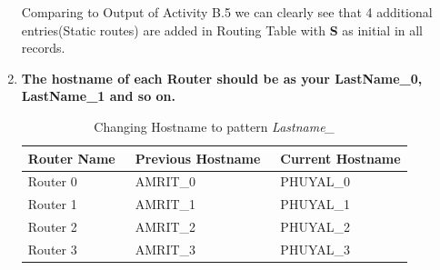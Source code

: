\documentclass[a4paper,11pt]{article}
\begin{document}
\begin{enumerate}

          Comparing to Output of Activity B.5  we can clearly see that 4 additional entries(Static routes) are added in Routing Table with \textbf{S} as initial in all records.

    \item\textbf{ The hostname of each Router should be as your LastName\_0, LastName\_1 and so on.}

          \begin{table}[H]
              \centering
              \begin{tabular}{| m{9em}| m{12em}| m{9em} |}
                  \hline
                  \rowcolor[rgb]{0.243,0.898,1} \textbf{Router Name~} & \textbf{Previous Hostname~} & \textbf{Current Hostname} \\
                  \hline
                  Router 0                                            & AMRIT\_0                    & PHUYAL\_0                 \\
                  \hline
                  Router 1                                            & AMRIT\_1                    & PHUYAL\_1                 \\
                  \hline
                  Router 2                                            & AMRIT\_2                    & PHUYAL\_2                 \\
                  \hline
                  Router 3                                            & AMRIT\_3                    & PHUYAL\_3                 \\
                  \hline
              \end{tabular}
              \caption{Changing Hostname to pattern \textit{Lastname\_}}
          \end{table}


\end{enumerate}
\end{document}

